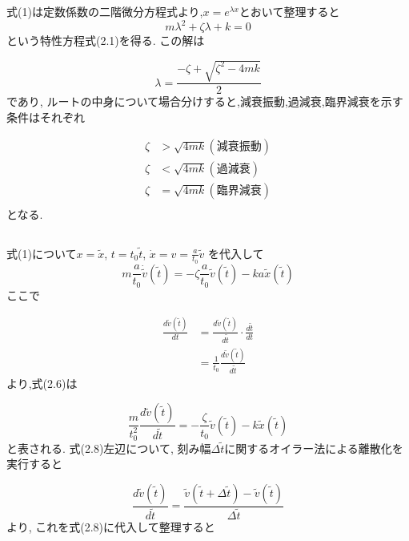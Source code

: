 \documentclass[a4paper,dvipdfmx]{jarticle}
\begin{document}
\noindent
式(1)は定数係数の二階微分方程式より,$x=e^{\lambda x}$とおいて整理すると
\begin{equation}
    m\lambda^2 + \zeta\lambda + k = 0 \tag{2.1}
\end{equation}
という特性方程式(2.1)を得る. この解は

\begin{equation}
    \lambda = \frac{-\zeta + \sqrt{\zeta^2 - 4mk}}{2} \tag{2.2}
\end{equation}
であり, ルートの中身について場合分けすると,減衰振動,過減衰,臨界減衰を示す条件はそれぞれ

\begin{align*}
    \zeta & > \sqrt{4mk}　　 (減衰振動) \tag{2.3}\\
    \zeta & < \sqrt{4mk}　　 (過減衰) \tag{2.4}\\
    \zeta & = \sqrt{4mk}　　 (臨界減衰) \tag{2.5}\\
\end{align*}
となる.


\subsection{}

\noindent
式(1)について$x = \tilde{x}$, $t = t_0 \tilde{t}$, $\dot{x} = v = \frac{a}{t_0} \tilde{v}$
を代入して
\begin{equation}
    m \frac{a}{t_0} \dot{\tilde{v}}(\tilde{t}) = -\zeta \frac{a}{t_0} \tilde{v}(\tilde{t})
    -k a \tilde{x}(\tilde{t}) \tag{2.6}
\end{equation}
ここで

\begin{align*}
    \frac{d \tilde{v}(\tilde{t})}{dt} &= \frac{d \tilde{v}(\tilde{t})}{d \tilde{t}} \cdot \frac{d \tilde{t}}{dt} \\
    &= \frac{1}{t_0} \frac{d \tilde{v}(\tilde{t})}{d \tilde{t}} \tag{2.7}
\end{align*}
より,式(2.6)は

\begin{equation}
    \frac{m}{t_0^2} \frac{d \tilde{v}(\tilde{t})}{d \tilde{t}} = - \frac{\zeta}{t_0} \tilde{v}(\tilde{t})
    -k \tilde{x}(\tilde{t}) \tag{2.8}
\end{equation}
と表される. 式(2.8)左辺について, 刻み幅$\Delta \tilde{t}$に関するオイラー法による離散化を実行すると

\begin{equation}
    \frac{d \tilde{v}(\tilde{t})}{d \tilde{t}} = \frac{\tilde{v}(\tilde{t} + \Delta \tilde{t}) - \tilde{v}(\tilde{t})}{\Delta \tilde{t}} 
    \tag {2.9}
\end{equation}
より, これを式(2.8)に代入して整理すると
\end{document}
